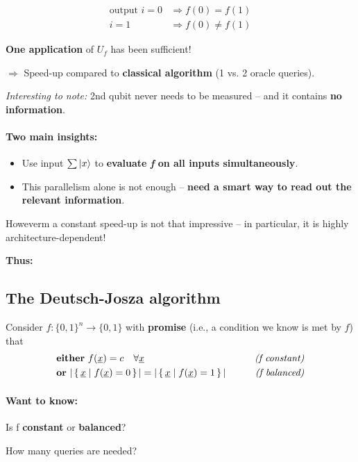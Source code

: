 \documentclass[a4paper, 12pt]{article}
\theoremstyle{plain}
\theoremstyle{definition}
\theoremstyle{remark}
\begin{document}
  \begin{align*}
    \text{output }i=0 &\Longrightarrow f(0)=f(1) \\
    i=1 &\Longrightarrow f(0)\neq f(1)
  \end{align*}

  \textbf{One application} of $U_f$ has been sufficient!

  $\Longrightarrow$ Speed-up compared to \textbf{classical algorithm} (1 vs. 2 oracle queries).

  \emph{Interesting to note:} 2nd qubit never needs to be measured -- and it contains \textbf{no information}.

  \paragraph{Two main insights:}
  \begin{itemize}
    \item Use input $\sum \ket{x}$ to \textbf{evaluate \emph{f} on all inputs simultaneously}.
    \item This parallelism alone is not enough -- \textbf{need a smart way to read out the relevant information}.
  \end{itemize}
  Howeverm a constant speed-up is not that impressive -- in particular, it is highly architecture-dependent!

  \textbf{Thus:}
  \subsection{The Deutsch-Josza algorithm}
  Consider $f:\{0,1\}^n\rightarrow\{0,1\}$ with \textbf{promise} (i.e., a condition we know is met by $f$) that
  \begin{align*}
    &\text{\textbf{either} } f(\underline{x}) = c \quad \forall \underline{x} \qquad &\text{\emph{(f constant)}}\\
    &\text{\textbf{or} } |\set{\underline{x}|f(\underline{x})=0}|=|\set{\underline{x}|f(\underline{x})=1}| \qquad &\text{\emph{(f balanced)}}
  \end{align*}

  \paragraph{Want to know:} Is f \textbf{constant} or \textbf{balanced}?
  \begin{center}
    How many queries are needed?
  \end{center}
\end{document}
